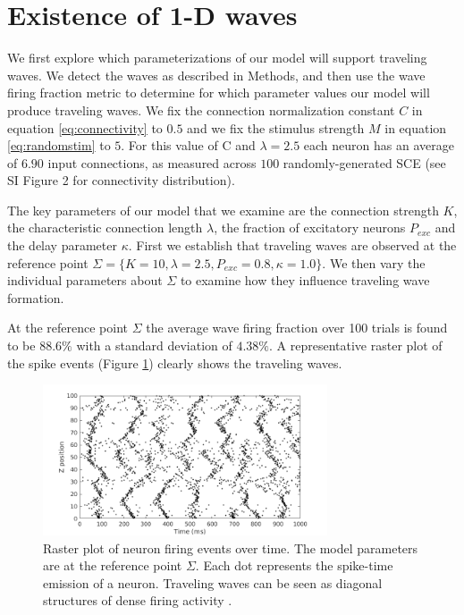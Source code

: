 \FloatBarrier

\section{Existence of 1-D waves} \label{sub:waves}
We first explore which parameterizations of our model will support traveling waves.
We detect the waves as described in Methods, and then use the wave firing fraction metric to determine for which parameter values our model will produce traveling waves.
We fix the connection normalization constant $C$ in equation \ref{eq:connectivity} to $0.5$ and we fix the stimulus strength $M$ in equation \ref{eq:randomstim} to $5$.
For this value of C and $\lambda=2.5$ each neuron has an average of $6.90$ input connections, as measured across $100$ randomly-generated SCE (see SI Figure 2 for connectivity distribution).

The key parameters of our model that we examine are the connection strength $K$, the characteristic connection length $\lambda$, the fraction of excitatory neurons $P_{exc}$ and the delay parameter $\kappa$.
First we establish that traveling waves are observed at the reference  point $\Sigma = \{K=10,\lambda=2.5,P_{exc}=0.8,\kappa=1.0 \}$.
We then vary the individual parameters about $\Sigma$ to examine how they influence traveling wave formation.

At the reference  point $\Sigma$ the average wave firing fraction over 100 trials is found to be $88.6\%$ with a standard deviation of $4.38\%$.
A representative raster plot of the spike events (Figure \ref{fig:sigma_raster}) clearly shows the traveling waves.
\begin{figure}[!htb]
  \centering
  \includegraphics[width=0.75\textwidth]{fig/baseline}
  \caption{Raster plot of neuron firing events over time. The model parameters are at the reference  point $\Sigma$. 
	Each dot represents the spike-time emission of a neuron. 
	Traveling waves can be seen as diagonal structures of dense firing activity \citet{Senk2020}. }
  \label{fig:sigma_raster}
\end{figure}
\FloatBarrier

